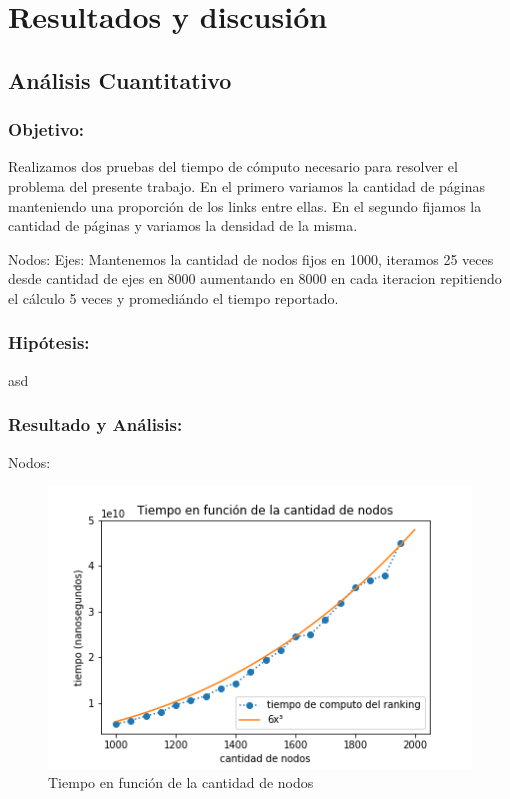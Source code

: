 \section{Resultados y discusión}

\subsection{Análisis Cuantitativo}

\subsubsection{Objetivo:}

Realizamos dos pruebas del tiempo de cómputo necesario para resolver el problema del presente trabajo.
En el primero variamos la cantidad de páginas manteniendo una proporción de los links entre ellas.
En el segundo fijamos la cantidad de páginas y variamos la densidad de la misma.


Nodos:
Ejes: Mantenemos la cantidad de nodos fijos en 1000, iteramos 25 veces desde cantidad de ejes en 8000 aumentando en 8000 en cada iteracion repitiendo el cálculo 5 veces y promediándo el tiempo reportado.


\subsubsection{Hipótesis:}

asd

\subsubsection{Resultado y Análisis: }

Nodos:

\begin{figure}[h]
   \begin{center}
     \includegraphics{img/tiempo_nodos_prop.png} 
  \end{center}
\caption{Tiempo en función de la cantidad de nodos} \label{fig:exp1-nodos}
\end{figure}


